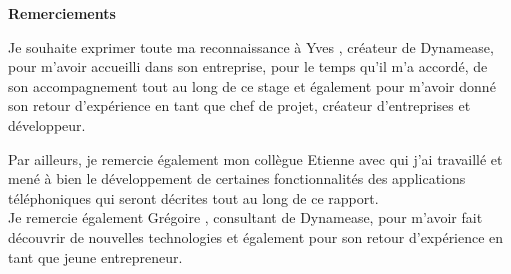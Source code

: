 \begin{center}
        \Huge{\bf Remerciements}\\[1.5cm]
\end{center}

Je souhaite exprimer toute ma reconnaissance à Yves , créateur de Dynamease, pour m’avoir accueilli dans son entreprise, pour le temps qu’il m’a accordé, de son accompagnement tout au long de ce stage et également pour m'avoir donné son retour d'expérience en tant que chef de projet, créateur d'entreprises et développeur.

Par ailleurs, je remercie également mon collègue Etienne  avec qui j’ai travaillé et mené à bien le développement de certaines fonctionnalités des applications téléphoniques qui seront décrites tout au long de ce rapport.\\

Je remercie également Grégoire , consultant de Dynamease, pour m'avoir fait découvrir de nouvelles technologies et également pour son retour d'expérience en tant que jeune entrepreneur. 